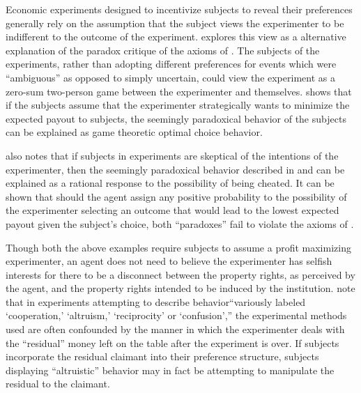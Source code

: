 \documentclass[../main.tex]{subfiles}
\begin{document}
Economic experiments designed to incentivize subjects to reveal their preferences generally rely on the assumption that the subject views the experimenter to be indifferent to the outcome of the experiment.
\textcite{Schneeweiss1973} explores this view as a alternative explanation of the \textcite{Ellsberg1961} paradox critique of the axioms of \textcite{Savage1954}.
The subjects of the \textcite{Ellsberg1961} experiments, rather than adopting different preferences for events which were \enquote{ambiguous} as opposed to simply uncertain, could view the experiment as a zero-sum two-person game between the experimenter and themselves.
\textcite{Schneeweiss1973} shows that if the subjects assume that the experimenter strategically wants to minimize the expected payout to subjects, the seemingly paradoxical behavior of the subjects can be explained as game theoretic optimal choice behavior.

\textcite{Kadane1992} also notes that if subjects in experiments are skeptical of the intentions of the experimenter, then the seemingly paradoxical behavior described in \textcite{Ellsberg1961} and \textcite{Allais1953} can be explained as a rational response to the possibility of being cheated.
It can be shown that should the agent assign any positive probability to the possibility of the experimenter selecting an outcome that would lead to the lowest expected payout given the subject's choice, both \enquote{paradoxes} fail to violate the axioms of \textcite{Savage1954}.

Though both the above examples require subjects to assume a profit maximizing experimenter, an agent does not need to believe the experimenter has selfish interests for there to be a disconnect between the property rights, as perceived by the agent, and the property rights intended to be induced by the institution.
\textcite[178]{Harrison2006} note that in experiments attempting to describe behavior\enquote{variously labeled \enquote{cooperation,} \enquote{altruism,} \enquote{reciprocity} or \enquote{confusion},} the experimental methods used are often confounded by the manner in which the experimenter deals with the \enquote{residual} money left on the table after the experiment is over.
If subjects incorporate the residual claimant into their preference structure, subjects displaying \enquote{altruistic} behavior may in fact be attempting to manipulate the residual to the claimant.
\end{document}
